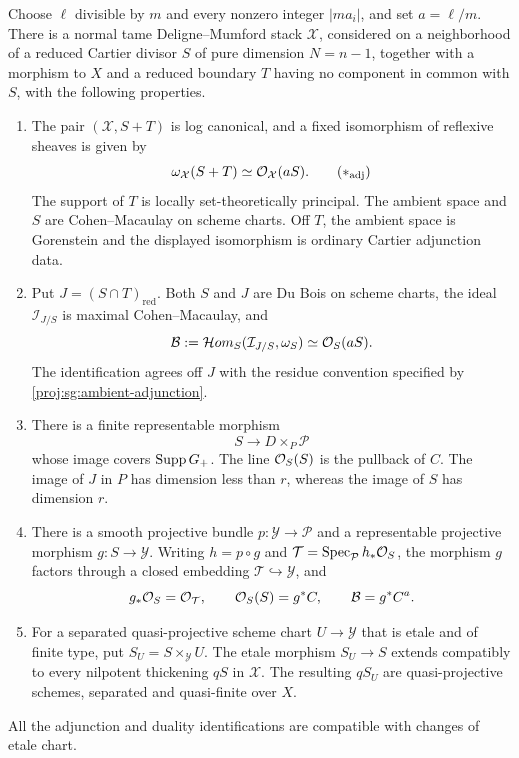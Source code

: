 \begin{proposition}\label{proj:prop:signed-construction}
Choose $\ell$ divisible by $m$ and every nonzero integer $|ma_i|$,
and set $a=\ell/m$.  There is a normal tame Deligne--Mumford stack
$\mathcal X$, considered on a neighborhood of a reduced Cartier
divisor $S$ of pure dimension $N=n-1$, together with a morphism
to $X$ and a reduced boundary
$T$ having no component in common with $S$, with the following
properties.
\begin{enumerate}[label=\textup{(\roman*)}]
\item
The pair $(\mathcal X,S+T)$ is log canonical, and a fixed
isomorphism of reflexive sheaves is given by
\[
 \omega_{\mathcal X}(S+T)\simeq\OO_{\mathcal X}(aS).
 \tag{\(\ast_{\mathrm{adj}}\)}\label{proj:sg:ambient-adjunction}
\]
The support of $T$ is locally set-theoretically principal.
The ambient space and $S$ are Cohen--Macaulay on scheme charts.
Off $T$, the ambient space is Gorenstein and the displayed
isomorphism is ordinary Cartier adjunction data.

\item
Put $J=(S\cap T)_{\mathrm{red}}$.  Both $S$ and $J$ are Du Bois
on scheme charts, the ideal $\mathcal I_{J/S}$ is maximal
Cohen--Macaulay, and
\[
 \mathcal B:=
 \mathcal Hom_S(\mathcal I_{J/S},\omega_S)
 \simeq\mathcal{O}_S(aS).
\]
The identification agrees off $J$ with the residue convention
specified by \eqref{proj:sg:ambient-adjunction}.

\item
There is a finite representable morphism
\[
 S\longrightarrow D\times_P\mathcal P
\]
whose image covers $\operatorname{Supp} G_+$.  The line $\mathcal{O}_S(S)$ is the pullback
of $C$.  The image of $J$ in $P$ has dimension less than $r$,
whereas the image of $S$ has dimension $r$.

\item
There is a smooth projective bundle $p:\mathcal Y\to\mathcal P$
and a representable projective morphism $g:S\to\mathcal Y$.
Writing $h=p\circ g$ and
$\mathcal T=\operatorname{Spec}_{\mathcal P}h_*\mathcal{O}_S$, the morphism $g$ factors
through a closed embedding $\mathcal T\hookrightarrow\mathcal Y$,
and
\[
 g_*\mathcal{O}_S=\mathcal{O}_{\mathcal T},\qquad
 \mathcal{O}_S(S)=g^*C,\qquad \mathcal B=g^*C^a.
\]

\item
For a separated quasi-projective scheme chart
$U\to\mathcal Y$ that is etale and of finite type, put
$S_U=S\times_{\mathcal Y}U$.
The etale morphism $S_U\to S$ extends compatibly to every
nilpotent thickening $qS$ in $\mathcal X$.
The resulting $qS_U$ are quasi-projective schemes, separated
and quasi-finite over $X$.
\end{enumerate}
All the adjunction and duality identifications are compatible
with changes of etale chart.
\end{proposition}


